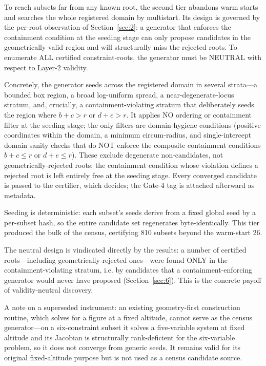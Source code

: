 \documentclass[pdflatex,sn-mathphys-num]{sn-jnl}
\begin{document}
To reach subsets far from any known root, the second tier abandons warm starts and searches the whole registered domain by multistart. Its design is governed by the per-root observation of Section~\ref{sec:2}: a generator that enforces the containment condition at the seeding stage can only propose candidates in
the geometrically-valid region and will structurally miss the rejected roots. To enumerate ALL certified constraint-roots, the generator must be NEUTRAL with respect to Layer-2 validity.

Concretely, the generator seeds across the registered domain in several strata---a bounded box region, a broad log-uniform spread, a near-degenerate-locus stratum, and, crucially, a containment-violating stratum that deliberately seeds the region where $b+c>r$ or $d+e>r$. It applies NO ordering or containment filter at the seeding stage; the only filters are domain-hygiene conditions (positive coordinates within the domain, a minimum circum-radius, and single-intercept domain sanity checks that do NOT enforce the composite containment conditions $b+c\le r$ or $d+e\le r$). These exclude degenerate non-candidates, not geometrically-rejected roots; the containment condition whose violation defines a rejected root is left entirely free at the seeding stage. Every converged candidate is passed to the certifier, which decides; the Gate-4 tag is attached afterward as metadata.

Seeding is deterministic: each subset's seeds derive from a fixed global seed by a per-subset hash, so the entire candidate set regenerates byte-identically. This tier produced the bulk of the census, certifying 810 subsets beyond the warm-start 26.

The neutral design is vindicated directly by the results: a number of certified roots---including geometrically-rejected ones---were found ONLY in the containment-violating stratum, i.e. by candidates that a containment-enforcing generator would never have proposed (Section~\ref{sec:6}). This is the
concrete payoff of validity-neutral discovery.

A note on a superseded instrument: an existing geometry-first construction routine, which solves for a figure at a fixed altitude, cannot serve as the census generator---on a six-constraint subset it solves a five-variable system at fixed altitude and its Jacobian is structurally rank-deficient for the six-variable problem, so it does not converge from generic seeds. It remains valid for its original fixed-altitude purpose but is not used as a census candidate source.
\end{document}
